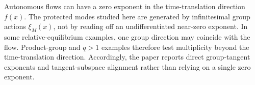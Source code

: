 Autonomous flows can have a zero exponent in the time-translation direction \(f(x)\).
The protected modes studied here are generated by infinitesimal group actions \(\xi_M(x)\), not by reading off an undifferentiated near-zero exponent.
In some relative-equilibrium examples, one group direction may coincide with the flow.
Product-group and \(q>1\) examples therefore test multiplicity beyond the time-translation direction.
Accordingly, the paper reports direct group-tangent exponents and tangent-subspace alignment rather than relying on a single zero exponent.
